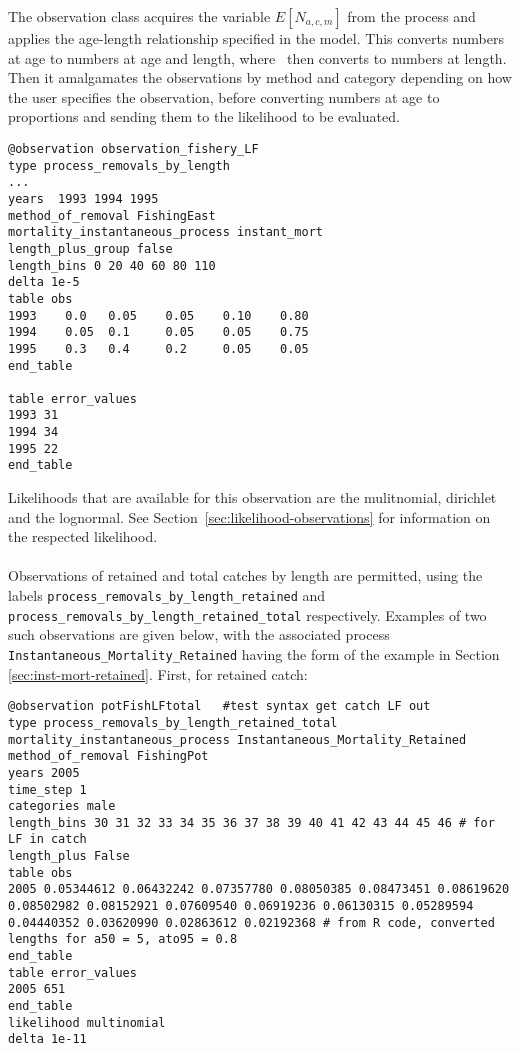 \begin{itemize}
The observation class acquires the variable $E[N_{a,c,m}]$ from the process and applies the age-length relationship specified in the model. This converts numbers at age to numbers at age and length, where \CNAME\ then converts to numbers at length. Then it amalgamates the observations by method and category depending on how the user specifies the observation, before converting numbers at age to proportions and sending them to the likelihood to be evaluated.
{\small{\begin{verbatim}
@observation observation_fishery_LF
type process_removals_by_length
...
years  1993 1994 1995 
method_of_removal FishingEast
mortality_instantaneous_process instant_mort
length_plus_group false
length_bins 0 20 40 60 80 110
delta 1e-5
table obs
1993    0.0   0.05    0.05    0.10    0.80  
1994    0.05  0.1     0.05    0.05    0.75  
1995    0.3   0.4     0.2     0.05    0.05  
end_table

table error_values
1993 31
1994 34
1995 22
end_table   
\end{verbatim}}}

Likelihoods that are available for this observation are the mulitnomial, dirichlet and the lognormal. See Section~\ref{sec:likelihood-observations} for information on the respected likelihood.

\paragraph*{\label{sec:removals-by-length-retained}}	
Observations of retained and total catches by length are permitted, using the labels \texttt{process\_removals\_by\_length\_retained} and \texttt{process\_removals\_by\_length\_retained\_total} respectively. Examples of two such observations are given below, with the associated process \texttt{Instantaneous\_Mortality\_Retained} having the form of the example in Section \ref{sec:inst-mort-retained}. First, for retained catch:

{\small{\begin{verbatim}
@observation potFishLFtotal   #test syntax get catch LF out
type process_removals_by_length_retained_total
mortality_instantaneous_process Instantaneous_Mortality_Retained
method_of_removal FishingPot
years 2005
time_step 1
categories male
length_bins 30 31 32 33 34 35 36 37 38 39 40 41 42 43 44 45 46 # for LF in catch
length_plus False
table obs
2005 0.05344612 0.06432242 0.07357780 0.08050385 0.08473451 0.08619620 0.08502982 0.08152921 0.07609540 0.06919236 0.06130315 0.05289594 0.04440352 0.03620990 0.02863612 0.02192368 # from R code, converted lengths for a50 = 5, ato95 = 0.8
end_table
table error_values
2005 651
end_table
likelihood multinomial
delta 1e-11
\end{verbatim}}}


\end{itemize}
